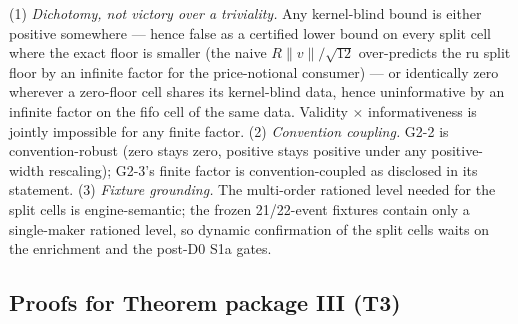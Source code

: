 \begin{remark}
\label{rem:g2-hostile}
(1) \emph{Dichotomy, not victory over a triviality.} Any kernel-blind bound
is either positive somewhere --- hence false as a certified lower bound on
every split cell where the exact floor is smaller (the naive
$R\|v\|/\sqrt{12}$ over-predicts the ru split floor by an infinite factor
for the price-notional consumer) --- or identically zero wherever a
zero-floor cell shares its kernel-blind data, hence uninformative by an
infinite factor on the fifo cell of the same data. Validity $\times$
informativeness is jointly impossible for any finite factor.
(2) \emph{Convention coupling.} G2-2 is convention-robust (zero stays zero,
positive stays positive under any positive-width rescaling); G2-3's finite
factor is convention-coupled as disclosed in its statement. (3)
\emph{Fixture grounding.} The multi-order rationed level needed for the
split cells is engine-semantic; the frozen 21/22-event fixtures contain only
a single-maker rationed level, so dynamic confirmation of the split cells
waits on the enrichment and the post-D0 S1a gates.
\end{remark}

\subsection{Proofs for Theorem package III (T3)}
\label{app:proofs-t3}

